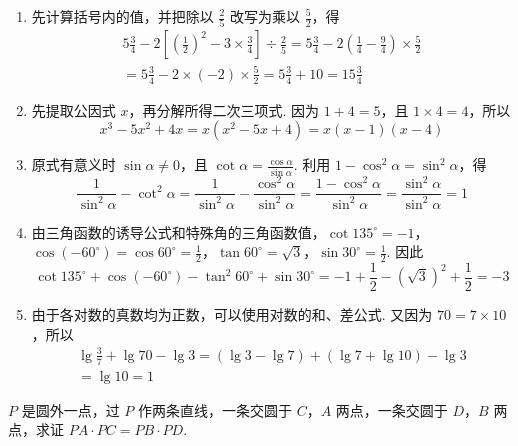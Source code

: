 \begin{solution}
\begin{enumerate}
\item 先计算括号内的值，并把除以 \(\frac{2}{5}\) 改写为乘以 \(\frac{5}{2}\)，得
\[
\begin{gathered}
5\frac{3}{4}-2\left[ \left( \frac{1}{2} \right)^2-3\times\frac{3}{4} \right]\div\frac{2}{5}
=5\frac{3}{4}-2\left(\frac{1}{4}-\frac{9}{4}\right)\times\frac{5}{2}\\
=5\frac{3}{4}-2\times(-2)\times\frac{5}{2}=5\frac{3}{4}+10=15\frac{3}{4}
\end{gathered}
\]

\item 先提取公因式 \(x\)，再分解所得二次三项式. 因为 \(1+4=5\)，且 \(1\times4=4\)，所以
\[
x^3-5x^2+4x=x\left(x^2-5x+4\right)=x\left(x-1\right)\left(x-4\right)
\]

\item 原式有意义时 \(\sin\alpha\ne0\)，且 \(\cot\alpha=\frac{\cos\alpha}{\sin\alpha}\). 利用 \(1-\cos^2\alpha=\sin^2\alpha\)，得
\[
\frac{1}{\sin^2\alpha}-\cot^2\alpha
=\frac{1}{\sin^2\alpha}-\frac{\cos^2\alpha}{\sin^2\alpha}
=\frac{1-\cos^2\alpha}{\sin^2\alpha}
=\frac{\sin^2\alpha}{\sin^2\alpha}=1
\]

\item 由三角函数的诱导公式和特殊角的三角函数值，\(\cot135^\circ=-1\)，\(\cos(-60^\circ)=\cos60^\circ=\frac{1}{2}\)，\(\tan60^\circ=\sqrt{3}\)，\(\sin30^\circ=\frac{1}{2}\). 因此
\[
\cot135^\circ+\cos(-60^\circ)-\tan^2 60^\circ+\sin30^\circ
=-1+\frac{1}{2}-\left(\sqrt{3}\right)^2+\frac{1}{2}=-3
\]

\item 由于各对数的真数均为正数，可以使用对数的和、差公式. 又因为 \(70=7\times10\)，所以
\[
\begin{gathered}
\lg\frac{3}{7}+\lg70-\lg3
=\left(\lg3-\lg7\right)+\left(\lg7+\lg10\right)-\lg3\\
=\lg10=1
\end{gathered}
\]
\end{enumerate}
\end{solution}

\begin{problem}
\(P\) 是圆外一点，过 \(P\) 作两条直线，一条交圆于 \(C\)，\(A\) 两点，一条交圆于 \(D\)，\(B\) 两点，求证 \( PA\cdot PC=PB\cdot PD \).
\end{problem}

